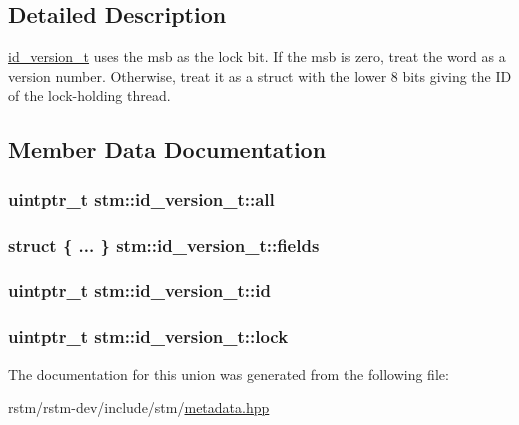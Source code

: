 \subsection{Detailed Description}
\hyperlink{unionstm_1_1id__version__t}{id\-\_\-version\-\_\-t} uses the msb as the lock bit. If the msb is zero, treat the word as a version number. Otherwise, treat it as a struct with the lower 8 bits giving the I\-D of the lock-\/holding thread. 

\subsection{Member Data Documentation}
\hypertarget{unionstm_1_1id__version__t_a10064f484ae15db0ae6943fa48a2cb9e}{
\subsubsection[{all}]{\setlength{\rightskip}{0pt plus 5cm}uintptr\-\_\-t stm\-::id\-\_\-version\-\_\-t\-::all}}\label{unionstm_1_1id__version__t_a10064f484ae15db0ae6943fa48a2cb9e}
\hypertarget{unionstm_1_1id__version__t_a76e19433e55adf1359e31402c6d966dc}{
\subsubsection[{fields}]{\setlength{\rightskip}{0pt plus 5cm}struct \{ ... \}   stm\-::id\-\_\-version\-\_\-t\-::fields}}\label{unionstm_1_1id__version__t_a76e19433e55adf1359e31402c6d966dc}
\hypertarget{unionstm_1_1id__version__t_a1f425cb109ebb01b517b0b8de74ebb06}{
\subsubsection[{id}]{\setlength{\rightskip}{0pt plus 5cm}uintptr\-\_\-t stm\-::id\-\_\-version\-\_\-t\-::id}}\label{unionstm_1_1id__version__t_a1f425cb109ebb01b517b0b8de74ebb06}
\hypertarget{unionstm_1_1id__version__t_a8064c40e44c8e2912c89683a31e45eed}{
\subsubsection[{lock}]{\setlength{\rightskip}{0pt plus 5cm}uintptr\-\_\-t stm\-::id\-\_\-version\-\_\-t\-::lock}}\label{unionstm_1_1id__version__t_a8064c40e44c8e2912c89683a31e45eed}


The documentation for this union was generated from the following file\-:\begin{DoxyCompactItemize}
\item 
rstm/rstm-\/dev/include/stm/\hyperlink{metadata_8hpp}{metadata.\-hpp}\end{DoxyCompactItemize}
